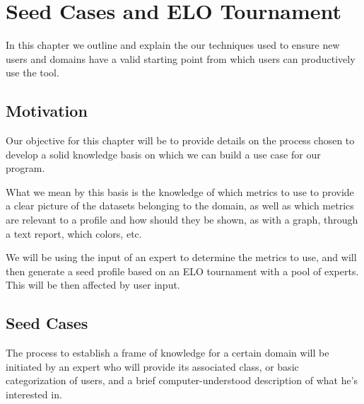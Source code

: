 %
%

\chapter{Seed Cases and ELO Tournament}

\begin{resumen}
In this chapter we outline and explain the our techniques used to ensure new users and domains have a valid starting point from which users can productively use the tool.
\end{resumen}

\linespread{1.6}

\section{Motivation}
\label{cap4:sec:motivation}

Our objective for this chapter will be to provide details on the process chosen to develop a solid knowledge basis on which we can build a use case for our program.

What we mean by this basis is the knowledge of which metrics to use to provide a clear picture of the datasets belonging to the domain, as well as which metrics are relevant to a profile and how should they be shown, as with a graph, through a text report, which colors, etc.

We will be using the input of an expert to determine the metrics to use, and will then generate a seed profile based on an ELO tournament with a pool of experts. This will be then affected by user input.

\section{Seed Cases}
\label{cap4:sec:metricseeds}

The process to establish a frame of knowledge for a certain domain will be initiated by an expert who will provide its associated class, 
or basic categorization of users, and a brief computer-understood description of what he's interested in.

